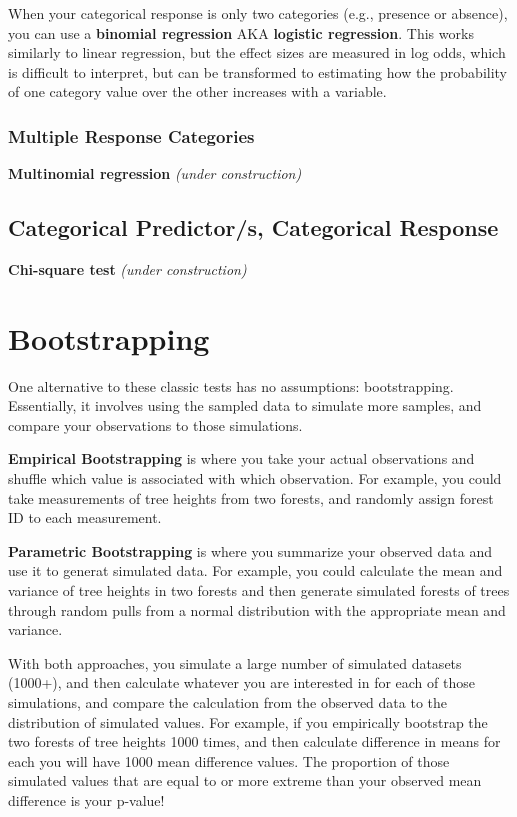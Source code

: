 \documentclass[
  letterpaper,
  DIV=11,
  numbers=noendperiod]{scrreprt}
\begin{document}
When your categorical response is only two categories (e.g., presence or
absence), you can use a \textbf{binomial regression} AKA
\textbf{logistic regression}. This works similarly to linear regression,
but the effect sizes are measured in log odds, which is difficult to
interpret, but can be transformed to estimating how the probability of
one category value over the other increases with a variable.

\hypertarget{multiple-response-categories}{%
\subsubsection{Multiple Response
Categories}\label{multiple-response-categories}}

\textbf{Multinomial regression} \emph{(under construction)}

\hypertarget{categorical-predictors-categorical-response}{%
\subsection{Categorical Predictor/s, Categorical
Response}\label{categorical-predictors-categorical-response}}

\textbf{Chi-square test} \emph{(under construction)}

\hypertarget{bootstrapping}{%
\section{Bootstrapping}\label{bootstrapping}}

One alternative to these classic tests has no assumptions:
bootstrapping. Essentially, it involves using the sampled data to
simulate more samples, and compare your observations to those
simulations.

\textbf{Empirical Bootstrapping} is where you take your actual
observations and shuffle which value is associated with which
observation. For example, you could take measurements of tree heights
from two forests, and randomly assign forest ID to each measurement.

\textbf{Parametric Bootstrapping} is where you summarize your observed
data and use it to generat simulated data. For example, you could
calculate the mean and variance of tree heights in two forests and then
generate simulated forests of trees through random pulls from a normal
distribution with the appropriate mean and variance.

With both approaches, you simulate a large number of simulated datasets
(1000+), and then calculate whatever you are interested in for each of
those simulations, and compare the calculation from the observed data to
the distribution of simulated values. For example, if you empirically
bootstrap the two forests of tree heights 1000 times, and then calculate
difference in means for each you will have 1000 mean difference values.
The proportion of those simulated values that are equal to or more
extreme than your observed mean difference is your p-value!
\end{document}
